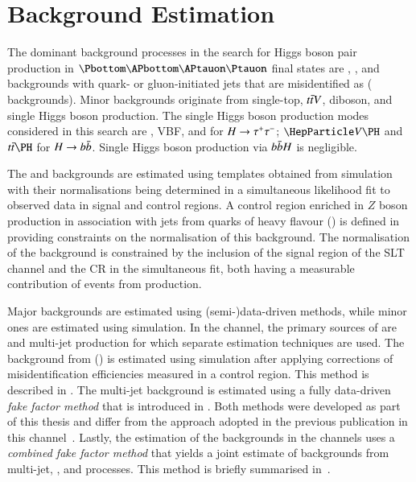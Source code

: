 \section{Background Estimation}%
\label{sec:background_estimation}

The dominant background processes in the search for Higgs boson pair production
in $\bbtautau$ final states are \Zjets, \ttbar, and backgrounds with quark- or
gluon-initiated jets that are misidentified as \tauhadvis (\faketauhadvis
backgrounds).
Minor backgrounds originate from single-top, $t\bar{t} V$, diboson, and single
Higgs boson production.  The single Higgs boson production modes considered in
this search are \ggF, VBF, \VH and \ttH for $H \to \tau^{+} \tau^{-}$; $\VH$ and $\ttH$
for $H \to b\bar{b}$. Single Higgs boson production via $b\bar{b} H$ is negligible.

The \Zjets and \ttbar backgrounds are estimated using templates obtained from
simulation with their normalisations being determined in a simultaneous
likelihood fit to observed data in signal and control regions. A control region
enriched in $Z$ boson production in association with jets from quarks of heavy
flavour (\ZHF) is defined in  providing constraints on the
normalisation of this background. The normalisation of the \ttbar background is
constrained by the inclusion of the signal region of the \lephad SLT channel and
the \ZHF CR in the simultaneous fit, both having a measurable contribution of
events from \ttbar production.

Major \faketauhadvis backgrounds are estimated using (semi-)data-driven methods,
while minor ones are estimated using simulation. In the \hadhad channel, the
primary sources of \faketauhadvis are \ttbar and multi-jet production for which
separate estimation techniques are used. The \faketauhadvis background from
\ttbar (\ttbarFakes) is estimated using simulation after applying corrections of
\jettotauhadvis misidentification efficiencies measured in a control
region. This method is described in . The
multi-jet background is estimated using a fully data-driven \emph{fake factor
  method} that is introduced in . Both methods were
developed as part of this thesis and differ from the approach adopted in the
previous publication in this channel~\cite{HIGG-2016-16-witherratum}. Lastly,
the estimation of the \faketauhadvis backgrounds in the \lephad channels uses a
\emph{combined fake factor method} that yields a joint estimate of
\faketauhadvis backgrounds from multi-jet, \Wjets, and \ttbar processes. This
method is briefly summarised in~.


